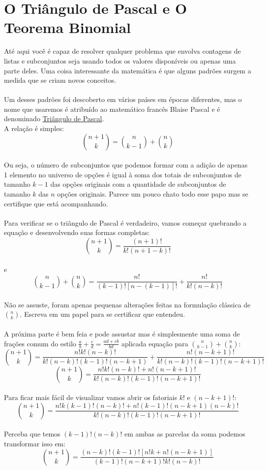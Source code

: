 \documentclass[main.tex]{subfiles}
\begin{document}
\section{O Triângulo de Pascal e O Teorema Binomial}
Até aqui você é capaz de resolver qualquer problema que envolva contagens de listas e subconjuntos seja usando todos os valores disponíveis ou apenas uma parte deles. Uma coisa interessante da matemática é que alguns padrões surgem a medida que se criam novos conceitos.
\\~\\
Um desses padrões foi descoberto em vários países em épocas diferentes, mas o nome que usaremos é atribuído ao matemático francês Blaise Pascal e é denominado \href{https://pt.wikipedia.org/wiki/Tri\%C3\%A2ngulo_de_Pascal}{Triângulo de Pascal}.
\\
A relação é simples:
\\
$$ {n+1 \choose k} = {n \choose k-1} + {n \choose k} $$
\\
Ou seja, o número de subconjuntos que podemos formar com a adição de apenas 1 elemento no universo de opções é igual à soma dos totais de subconjuntos de tamanho $k-1$ das opções originais com a quantidade de subconjuntos de tamanho $k$ das $n$ opções originais. Parece um pouco chato todo esse papo mas se certifique que está acompanhando.
\\~\\
Para verificar se o triângulo de Pascal é verdadeiro, vamos começar quebrando a equação e desenvolvendo suas formas completas:
$$ {n+1 \choose k} = \frac{(n+1)!}{k!(n+1-k)!}$$
\\
e
\\
$${n \choose k-1} + {n \choose k} = \frac{n!}{(k-1)![n-(k-1)]!} + \frac{n!}{k!(n-k)!}$$
\\
Não se assuste, foram apenas pequenas alterações feitas na formulação clássica de $n \choose k$. Escreva em um papel para se certificar que entendeu.
\\~\\
A próxima parte é bem feia e pode assustar mas é simplesmente uma soma de frações comum do estilo $\frac{a}{b} + \frac{c}{d} = \frac{ad+cb}{bd}$ aplicada equação para ${n \choose k-1} + {n \choose k}$:
$${n+1 \choose k} = \frac{n!k!(n-k)!}{k!(n-k)!(k-1)!(n-k+1)} + \frac{n!(n-k+1)!}{k!(n-k)!(k-1)!(n-k+1)!}$$
$${n+1 \choose k} = \frac{n!k!(n-k)! + n!(n-k+1)!}{k!(n-k)!(k-1)!(n-k+1)!}$$
\\
Para ficar mais fácil de visualizar vamos abrir os fatoriais $k!$ e $(n-k+1)!$:
$${n+1 \choose k} = \frac{n!k(k-1)!(n-k)! + n!(k-1)!(n-k+1)(n-k)!}{k!(n-k)!(k-1)!(n-k+1)!}$$
\\
Perceba que temos $(k-1)!(n-k)!$ em ambas as parcelas da soma podemos transformar isso em:
\\
$${n+1 \choose k} = \frac{(n-k)!(k-1)![n!k+n!(n-k+1)]}{(k-1)!(n-k+1)!k!(n-k)!}$$
\end{document}
